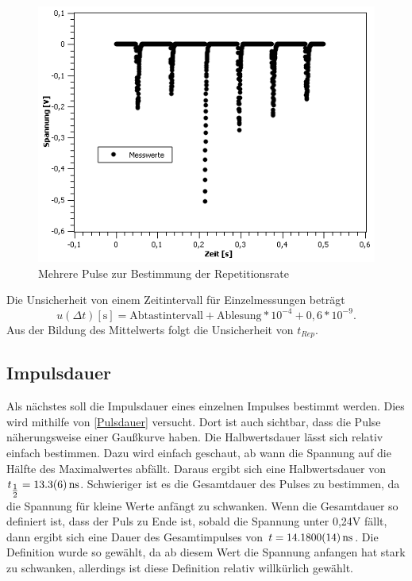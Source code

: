 \documentclass[
	a4paper,
	12pt,
	pagesize,
	ngerman
]{scrartcl}
\begin{document}
\begin{figure}[h!]
	\centering
	\includegraphics[scale=0.7]{Rep.png}
	\caption{Mehrere Pulse zur Bestimmung der Repetitionsrate}
	\label{Rep}
\end{figure}

Die Unsicherheit von einem Zeitintervall für Einzelmessungen beträgt 
\begin{equation}
u(\Delta t)[\text{s}] = \text{Abtastintervall} + \text{Ablesung} *10^{-4} +0,6*10^{-9}.
\label{eq:ut}
\end{equation}
Aus der Bildung des Mittelwerts folgt die Unsicherheit von $t_{Rep}$.

\subsection{Impulsdauer}
Als nächstes soll die Impulsdauer eines einzelnen Impulses bestimmt werden. Dies wird mithilfe von \cref{Pulsdauer} versucht. Dort ist auch sichtbar, dass die Pulse näherungsweise einer Gaußkurve haben. Die Halbwertsdauer lässt sich relativ einfach bestimmen. Dazu wird einfach geschaut, ab wann die Spannung auf die Hälfte des Maximalwertes abfällt. Daraus ergibt sich eine Halbwertsdauer von $t_{\tfrac{1}{2}} = \SI{13,3 \pm 0,6}{ns}$. Schwieriger ist es die Gesamtdauer des Pulses zu bestimmen, da die Spannung für kleine Werte anfängt zu schwanken. Wenn die Gesamtdauer so definiert ist, dass der Puls zu Ende ist, sobald die Spannung unter 0,24V fällt, dann ergibt sich eine Dauer des Gesamtimpulses von $t = \SI{14,180 \pm 0,0014}{ns}$. Die Definition wurde so gewählt, da ab diesem Wert die Spannung anfangen hat stark zu schwanken, allerdings ist diese Definition relativ willkürlich gewählt. 
\end{document}
